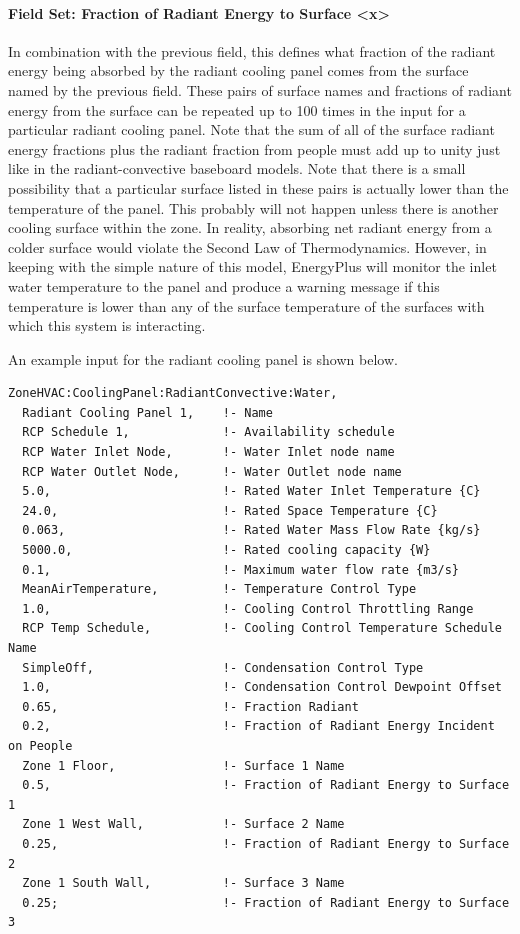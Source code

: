 \paragraph{Field Set: Fraction of Radiant Energy to Surface \textless{}x\textgreater{}}\label{field-set-fraction-of-radiant-energy-to-surface-x-1}

In combination with the previous field, this defines what fraction of the radiant energy being absorbed by the radiant cooling panel comes from the surface named by the previous field.  These pairs of surface names and fractions of radiant energy from the surface can be repeated up to 100 times in the input for a particular radiant cooling panel.  Note that the sum of all of the surface radiant energy fractions plus the radiant fraction from people must add up to unity just like in the radiant-convective baseboard models.  Note that there is a small possibility that a particular surface listed in these pairs is actually lower than the temperature of the panel.  This probably will not happen unless there is another cooling surface within the zone.  In reality, absorbing net radiant energy from a colder surface would violate the Second Law of Thermodynamics.  However, in keeping with the simple nature of this model, EnergyPlus will monitor the inlet water temperature to the panel and produce a warning message if this temperature is lower than any of the surface temperature of the surfaces with which this system is interacting.

An example input for the radiant cooling panel is shown below.

\begin{lstlisting}
ZoneHVAC:CoolingPanel:RadiantConvective:Water,
  Radiant Cooling Panel 1,    !- Name
  RCP Schedule 1,             !- Availability schedule
  RCP Water Inlet Node,       !- Water Inlet node name
  RCP Water Outlet Node,      !- Water Outlet node name
  5.0,                        !- Rated Water Inlet Temperature {C}
  24.0,                       !- Rated Space Temperature {C}
  0.063,                      !- Rated Water Mass Flow Rate {kg/s}
  5000.0,                     !- Rated cooling capacity {W}
  0.1,                        !- Maximum water flow rate {m3/s}
  MeanAirTemperature,         !- Temperature Control Type
  1.0,                        !- Cooling Control Throttling Range
  RCP Temp Schedule,          !- Cooling Control Temperature Schedule Name
  SimpleOff,                  !- Condensation Control Type
  1.0,                        !- Condensation Control Dewpoint Offset
  0.65,                       !- Fraction Radiant
  0.2,                        !- Fraction of Radiant Energy Incident on People
  Zone 1 Floor,               !- Surface 1 Name
  0.5,                        !- Fraction of Radiant Energy to Surface 1
  Zone 1 West Wall,           !- Surface 2 Name
  0.25,                       !- Fraction of Radiant Energy to Surface 2
  Zone 1 South Wall,          !- Surface 3 Name
  0.25;                       !- Fraction of Radiant Energy to Surface 3
\end{lstlisting}

